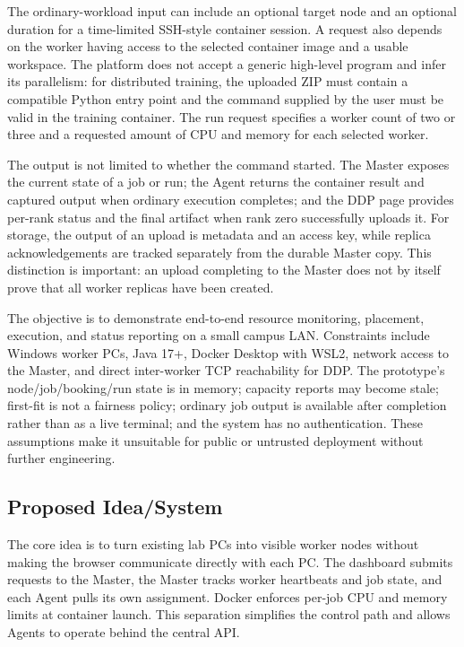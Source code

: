 \documentclass{article}
\begin{document}
The ordinary-workload input can include an optional target node and an optional duration for a time-limited SSH-style container session. A request also depends on the worker having access to the selected container image and a usable workspace. The platform does not accept a generic high-level program and infer its parallelism: for distributed training, the uploaded ZIP must contain a compatible Python entry point and the command supplied by the user must be valid in the training container. The run request specifies a worker count of two or three and a requested amount of CPU and memory for each selected worker.

The output is not limited to whether the command started. The Master exposes the current state of a job or run; the Agent returns the container result and captured output when ordinary execution completes; and the DDP page provides per-rank status and the final artifact when rank zero successfully uploads it. For storage, the output of an upload is metadata and an access key, while replica acknowledgements are tracked separately from the durable Master copy. This distinction is important: an upload completing to the Master does not by itself prove that all worker replicas have been created.

The objective is to demonstrate end-to-end resource monitoring, placement, execution, and status reporting on a small campus LAN. Constraints include Windows worker PCs, Java 17+, Docker Desktop with WSL2, network access to the Master, and direct inter-worker TCP reachability for DDP. The prototype's node/job/booking/run state is in memory; capacity reports may become stale; first-fit is not a fairness policy; ordinary job output is available after completion rather than as a live terminal; and the system has no authentication. These assumptions make it unsuitable for public or untrusted deployment without further engineering.

	\subsection{Proposed Idea/System}
The core idea is to turn existing lab PCs into visible worker nodes without making the browser communicate directly with each PC. The dashboard submits requests to the Master, the Master tracks worker heartbeats and job state, and each Agent pulls its own assignment. Docker enforces per-job CPU and memory limits at container launch. This separation simplifies the control path and allows Agents to operate behind the central API.
\end{document}
